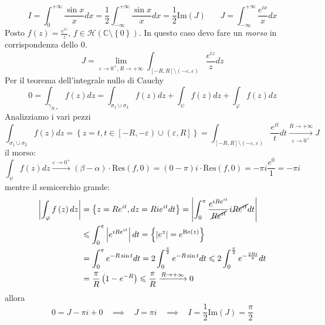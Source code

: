 \Soluzione
\begin{equation*}
I=\int ^{+\infty }_{0}\frac{\sin x}{x} dx=\frac{1}{2}\int ^{+\infty }_{-\infty }\frac{\sin x}{x} dx=\frac{1}{2}\mathrm{Im}\left( J\right) \ \ \ \ \ \ \ \ J=\int ^{+\infty }_{-\infty }\frac{e^{ix}}{x} dx
\end{equation*}
Posto $f\left( z\right) =\frac{e^{iz}}{z}$, $f\in \mathcal{H}\left(\mathbb{C} \setminus \left\{0\right\}\right)$. In questo caso devo fare un \textit{morso} in corrispondenza dello $0$.
\begin{equation*}
J=\lim _{\varepsilon \rightarrow 0^{+} ,R\rightarrow +\infty }\int _{\left[ -R,R\right] \setminus \left( -\varepsilon ,\varepsilon \right)}\frac{e^{iz}}{z} dz
\end{equation*}
Per il teorema dell'integrale nullo di Cauchy
\begin{equation*}
0=\int _{\gamma _{R,\varepsilon }} f\left( z\right) dz=\int _{\sigma _{1} \cup \sigma _{2}} f\left( z\right) dz+\int _{\psi } f\left( z\right) dz+\int _{\varphi } f\left( z\right) dz
\end{equation*}
Analizziamo i vari pezzi
\begin{equation*}
\int _{\sigma _{1} \cup \sigma _{2}} f\left( z\right) dz=\left\{z=t,t\in \left[ -R,-\varepsilon \right) \cup \left( \varepsilon ,R\right]\right\} =\int _{\left[ -R,R\right] \setminus \left( -\varepsilon ,\varepsilon \right)}\frac{e^{it}}{t} dt\xrightarrow[\varepsilon \rightarrow 0^{+}]{R\rightarrow +\infty } J
\end{equation*}
il morso:
\begin{equation*}
\int _{\psi } f\left( z\right) dz\xrightarrow{\varepsilon \rightarrow 0^{+}}\left( \beta -\alpha \right) \cdotp \mathrm{Res}\left( f,0\right) =\left( 0-\pi \right) i\cdotp \mathrm{Res}\left( f,0\right) =-\pi i\frac{e^{0}}{1} =-\pi i
\end{equation*}
mentre il semicerchio grande:
\begin{align*}
\left| \int _{\varphi } f\left( z\right) dz\right|  & =\left\{z=Re^{it} ,dz=Rie^{it} dt\right\} =\left| \int ^{\pi }_{0}\frac{e^{iRe^{it}}}{\cancel{Re^{it}}} i\cancel{Re^{it}} dt\right| \\
 & \leqslant \int ^{\pi }_{0}\left| e^{iRe^{it}}\right| dt=\left\{\left| e^{z}\right| =e^{\mathrm{Re}\left( z\right)}\right\}\\
 & =\int ^{\pi }_{0} e^{-R\sin t} dt=2\int ^{\frac{\pi }{2}}_{0} e^{-R\sin t} dt\leqslant 2\int ^{\frac{\pi }{2}}_{0} e^{-\frac{2Rt}{\pi }} dt\\
 & =\frac{\pi }{R}\left( 1-e^{-R}\right) \leqslant \frac{\pi }{R}\xrightarrow{R\rightarrow +\infty } 0
\end{align*}
allora
\begin{equation*}
0=J-\pi i+0\ \ \ \ \implies \ \ \ \ J=\pi i\ \ \ \ \implies \ \ \ \ I=\frac{1}{2}\mathrm{Im}\left( J\right) =\frac{\pi }{2}
\end{equation*}
\Soluzione

